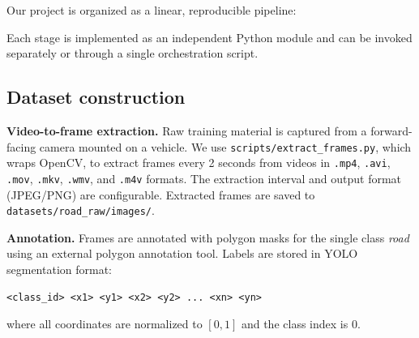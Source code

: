 \documentclass[11pt,a4paper]{article}
\newcommand{\tool}[1]{\texttt{#1}}
\begin{document}
Our project is organized as a linear, reproducible pipeline:
\begin{center}
\small
{}
\end{center}
Each stage is implemented as an independent Python module and can be invoked separately or through a single orchestration script.

\subsection{Dataset construction}

\textbf{Video-to-frame extraction.} Raw training material is captured from a forward-facing camera mounted on a vehicle. We use \tool{scripts/extract\_frames.py}, which wraps OpenCV, to extract frames every 2 seconds from videos in \tool{.mp4}, \tool{.avi}, \tool{.mov}, \tool{.mkv}, \tool{.wmv}, and \tool{.m4v} formats. The extraction interval and output format (JPEG/PNG) are configurable. Extracted frames are saved to \tool{datasets/road\_raw/images/}.

\textbf{Annotation.} Frames are annotated with polygon masks for the single class \emph{road} using an external polygon annotation tool. Labels are stored in YOLO segmentation format:
\begin{lstlisting}
<class_id> <x1> <y1> <x2> <y2> ... <xn> <yn>
\end{lstlisting}
where all coordinates are normalized to $[0,1]$ and the class index is 0.
\end{document}
